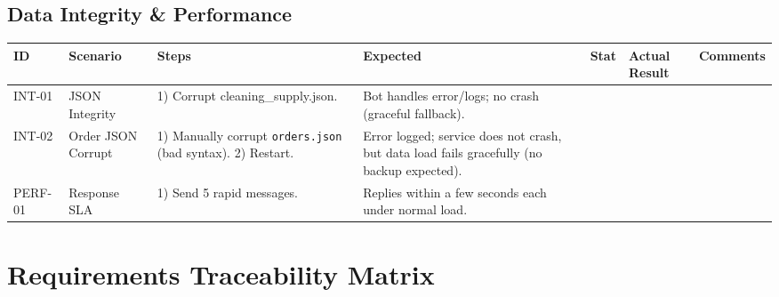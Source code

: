 ﻿\documentclass[11pt, a4paper]{article}
\begin{document}
\subsection{Data Integrity \& Performance}
\begin{longtable}{|p{}|p{}|p{}|p{}|p{}|p{}|p{}|}
    \hline
    \rowcolor{headergray} \textbf{ID} & \textbf{Scenario} & \textbf{Steps} & \textbf{Expected} & \textbf{Stat} & \textbf{Actual Result} & \textbf{Comments} \\ \hline
    \endhead

    INT-01 & JSON Integrity & 1) Corrupt cleaning\_supply.json. & Bot handles error/logs; no crash (graceful fallback). & & & \\ \hline

    INT-02 & Order JSON Corrupt & 1) Manually corrupt \texttt{orders.json} (bad syntax). 2) Restart. & Error logged; service does not crash, but data load fails gracefully (no backup expected). & & & \\ \hline

    PERF-01 & Response SLA & 1) Send 5 rapid messages. & Replies within a few seconds each under normal load. & & & \\ \hline
\end{longtable}

\newpage
\section{Requirements Traceability Matrix}
\end{document}
